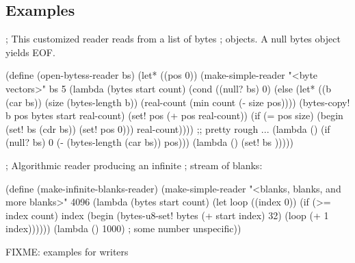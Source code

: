 \subsection{Examples}

\begin{schemenoindent}
; This customized reader reads from a list of bytes
; objects. A null bytes object yields EOF.

(define (open-bytess-reader bs)
  (let* ((pos 0))
    (make-simple-reader
     "<byte vectors>"
     bs
     5
     (lambda (bytes start count)
       (cond
        ((null? bs)
         0)
        (else
         (let* ((b (car bs))
                (size (bytes-length b))
                (real-count (min count (- size pos))))
           (bytes-copy! b pos
                           bytes start
                           real-count)
           (set! pos (+ pos real-count))
           (if (= pos size)
               (begin
                 (set! bs (cdr bs))
                 (set! pos 0)))
           real-count))))
     ;; pretty rough ...
     (lambda ()
       (if (null? bs)
           0
           (- (bytes-length (car bs)) pos)))
     \schfalse{} \schfalse{} \schfalse{}
     (lambda ()
       (set! bs \schfalse{})))))

; Algorithmic reader producing an infinite
; stream of blanks:

(define (make-infinite-blanks-reader)
  (make-simple-reader
    "<blanks, blanks, and more blanks>"
    \schfalse{}
    4096
    (lambda (bytes start count)
      (let loop ((index 0))
        (if (>= index count)
            index
            (begin
              (bytes-u8-set! bytes (+ start index) 32)
              (loop (+ 1 index))))))
    (lambda ()
      1000) ; some number
    \schfalse{} \schfalse{} \schfalse{}
    unspecific))

FIXME: examples for writers
\end{schemenoindent}
                    
